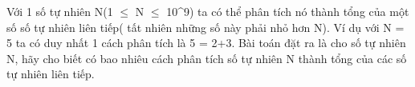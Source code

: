 Với 1 số tự nhiên N(1 $\le$  N  $\le$  10^9) ta có thể phân tích nó thành tổng của một số số tự nhiên liên tiếp( tất nhiên những số này phải nhỏ hơn N). Ví dụ với N = 5 ta có duy nhất 1 cách phân tích là 5 = 2+3.      Bài toán đặt ra là cho số tự nhiên N, hãy cho biết có bao nhiêu cách phân tích số tự nhiên N thành tổng của các số tự nhiên liên tiếp.  

\